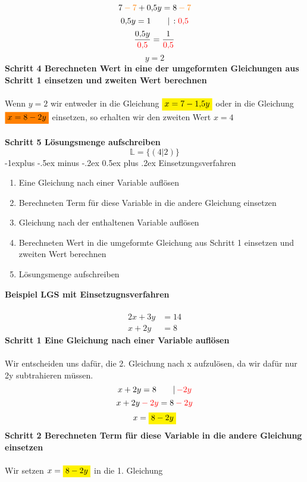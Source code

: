 \documentclass[10pt,landscape]{article}
\makeatletter
\renewcommand{\subsection}{\@startsection{subsection}{2}{0mm}%
                                {-1explus -.5ex minus -.2ex}%
                                {0.5ex plus .2ex}%
                                {\normalfont\normalsize\bfseries}}
\makeatother
\begin{document}
\begin{multicols}{3}
    \[7 {\color{orange} \: - \: 7} + 0{,}5y = 8 {\color{orange}\: - \: 7}\]
    \[0{,}5y = 1 \qquad |\, :{\color{red}0{,}5}\]
    \[\frac{0{,}5y}{{\color{red}0{,}5}} = \frac{1}{{\color{red}0{,}5}}\]
    \[y = 2\]
    \textbf{Schritt 4 Berechneten Wert in eine der umgeformten Gleichungen aus Schritt 1 einsetzen und zweiten Wert berechnen}\\~\\
    Wenn $y = 2$ wir entweder in die Gleichung ${\colorbox{yellow}{$x = 7 - 1{,}5y$}}$ oder in die Gleichung ${\colorbox{orange}{$x = 8 - 2y$}}$  einsetzen, so erhalten wir den zweiten Wert $x = 4$ \\~\\
    \textbf{Schritt 5 Lösungsmenge aufschreiben}
    \[\mathbb{L} = \{(4|2)\}\]
    \subsection{Einsetzungsverfahren}
    \begin{enumerate}
        \item     Eine Gleichung nach einer Variable auflösen
        \item     Berechneten Term für diese Variable in die andere Gleichung einsetzen
        \item     Gleichung nach der enthaltenen Variable auflösen
        \item     Berechneten Wert in die umgeformte Gleichung aus Schritt 1 einsetzen und zweiten Wert berechnen
        \item     Lösungsmenge aufschreiben
    \end{enumerate}
    \textbf{Beispiel LGS mit Einsetzugnsverfahren}\\~\\
    \begin{align*} 2x + 3y &= 14 \\ x + 2y &= 8 \end{align*}
    \textbf{Schritt 1 Eine Gleichung nach einer Variable auflösen}\\~\\
    Wir entscheiden uns dafür, die 2. Gleichung nach x aufzulösen, da wir dafür nur 2y subtrahieren müssen.
    \[x + 2y = 8 \qquad |\, {\color{red}-2y}\]
    \[x + 2y {\color{red}\: - \: 2y} = 8 {\color{red}\: - \: 2y}\]
    \[x = {\colorbox{yellow}{$8 - 2y$}}\]
    \textbf{Schritt 2 Berechneten Term für diese Variable in die andere Gleichung einsetzen}\\~\\
    Wir setzen $x = {\colorbox{yellow}{$8 - 2y$}}$ in die 1. Gleichung

\end{multicols}
\end{document}
